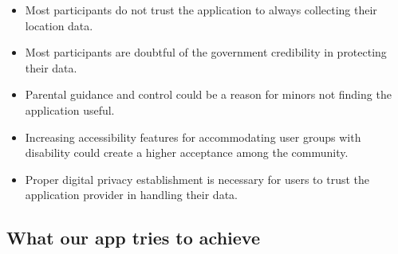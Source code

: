 \begin{enumerate}[1.]
\begin{itemize}
        \item Most participants do not trust the application to always collecting their location data.
        \item Most participants are doubtful of the government credibility in protecting their data.
        \item Parental guidance and control could be a reason for minors not finding the application useful.
        \item Increasing accessibility features for accommodating user groups with disability could create a higher acceptance among the community.
        \item Proper digital privacy establishment is necessary for users to trust the application provider in handling their data.
      \end{itemize}
  \end{enumerate}

\subsection{What our app tries to achieve}
